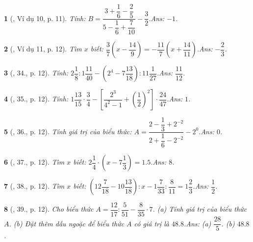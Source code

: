 \documentclass{article}
\newtheorem{baitoan}{}
\begin{document}
\begin{baitoan}[\cite{Tuyen_Toan_7}, Ví dụ 10, p. 11]
	Tính: $B = \dfrac{3 + \dfrac{1}{6} - \dfrac{2}{5}}{5 - \dfrac{1}{6} + \dfrac{7}{10}} - \dfrac{3}{2}$.\hfill{\sf Ans: $-1$.}
\end{baitoan}

\begin{baitoan}[\cite{Tuyen_Toan_7}, Ví dụ 11, p. 12]
	Tìm $x$ biết: $\dfrac{3}{7}\left(x - \dfrac{14}{9}\right) = -\dfrac{11}{7}\left(x + \dfrac{14}{11}\right)$.\hfill{\sf Ans: $-\dfrac{2}{3}$.}
\end{baitoan}

\begin{baitoan}[\cite{Tuyen_Toan_7}, 34., p. 12]
	Tính: $2\dfrac{1}{8}:1\dfrac{11}{40} - \left(2^4 - 7\dfrac{13}{18}\right):11\dfrac{1}{27}$.\hfill{\sf Ans: $\dfrac{11}{12}$.}
\end{baitoan}

\begin{baitoan}[\cite{Tuyen_Toan_7}, 35., p. 12]
	Tính: $1\dfrac{13}{15}\cdot\dfrac{3}{4} - \left[\dfrac{2^3}{4^2 - 1} + \left(\dfrac{1}{2}\right)^2\right]\cdot\dfrac{24}{47}$.\hfill{\sf Ans: $1$.}
\end{baitoan}

\begin{baitoan}[\cite{Tuyen_Toan_7}, 36., p. 12]
	Tính giá trị của biểu thức: $A = \dfrac{2 - \dfrac{1}{3} + 2^{-2}}{2 + \dfrac{1}{6} - 2^{-2}} - 2^0$.\hfill{\sf Ans: $0$.}
\end{baitoan}

\begin{baitoan}[\cite{Tuyen_Toan_7}, 37., p. 12]
	Tìm $x$ biết: $2\dfrac{1}{4}\cdot\left(x - 7\dfrac{1}{3}\right) = 1.5$.\hfill{\sf Ans: $8$.}
\end{baitoan}

\begin{baitoan}[\cite{Tuyen_Toan_7}, 38., p. 12]
	Tìm $x$ biết: $\left(12\dfrac{7}{18} - 10\dfrac{13}{18}\right):x - 1\dfrac{7}{33}:\dfrac{8}{11} = 1\dfrac{2}{3}$.\hfill{\sf Ans: $\dfrac{1}{2}$.}
\end{baitoan}

\begin{baitoan}[\cite{Tuyen_Toan_7}, 39., p. 12]
	Cho biểu thức $A = \dfrac{12}{17}:\dfrac{5}{51} - \dfrac{8}{35}\cdot 7$. (a) Tính giá trị của biểu thức $A$. (b) Đặt thêm dấu ngoặc để biểu thức $A$ có giá trị là $48.8$.\hfill{\sf Ans: (a) $\dfrac{28}{5}$. (b) $48.8$.}
\end{baitoan}
\end{document}
